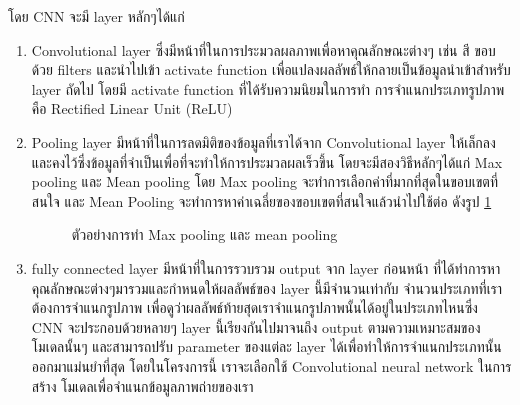 \documentclass[12pt,oneside,openright,a4paper]{cpe-thai-project}
\begin{document}
โดย CNN จะมี layer หลักๆได้แก่ 	
\begin{enumerate}
  \item Convolutional layer ซึ่งมีหน้าที่ในการประมวลผลภาพเพื่อหาคุณลักษณะต่างๆ เช่น สี ขอบ ด้วย filters และนำไปเข้า activate function เพื่อแปลงผลลัพธ์ให้กลายเป็นข้อมูลนำเข้าสำหรับ layer ถัดไป 
  โดยมี activate function ที่ได้รับความนิยมในการทำ การจำแนกประเภทรูปภาพ คือ Rectified Linear Unit (ReLU)
  \item Pooling layer มีหน้าที่ในการลดมิติของข้อมูลที่เราได้จาก Convolutional layer ให้เล็กลง และคงไว้ซึ่งข้อมูลที่จำเป็นเพื่อที่จะทำให้การประมวลผลเร็วขึ้น โดยจะมีสองวิธีหลักๆได้แก่ 
  Max pooling และ Mean pooling โดย Max pooling จะทำการเลือกค่าที่มากที่สุดในขอบเขตที่สนใจ และ Mean Pooling จะทำการหาค่าเฉลี่ยของขอบเขตที่สนใจแล้วนำไปใช้ต่อ ดังรูป \ref{fig:pooling} 
  \begin{figure}[!ht]\centering
    \setlength{\fboxrule}{0.2mm} %
    \setlength{\fboxsep}{1cm}
    \caption{ตัวอย่างการทำ Max pooling และ mean pooling}\label{fig:pooling}
  \end{figure}
  \item fully connected layer มีหน้าที่ในการรวบรวม output จาก layer ก่อนหน้า ที่ได้ทำการหา คุณลักษณะต่างๆมารวมและกำหนดให้ผลลัพธ์ของ layer นี้มีจำนวนเท่ากับ จำนวนประเภทที่เราต้องการจำแนกรูปภาพ 
  เพื่อดูว่าผลลัพธ์ท้ายสุดเราจำแนกรูปภาพนั้นได้อยู่ในประเภทไหนซึ่ง CNN จะประกอบด้วยหลายๆ layer นี้เรียงกันไปมาจนถึง output ตามความเหมาะสมของ โมเดลนั้นๆ และสามารถปรับ parameter ของแต่ละ layer ได้เพื่อทำให้การจำแนกประเภทนั้นออกมาแม่นยำที่สุด 
  โดยในโครงการนี้ เราจะเลือกใช้ Convolutional neural network ในการสร้าง โมเดลเพื่อจำแนกข้อมูลภาพถ่ายของเรา
\end{enumerate}
\end{document}
